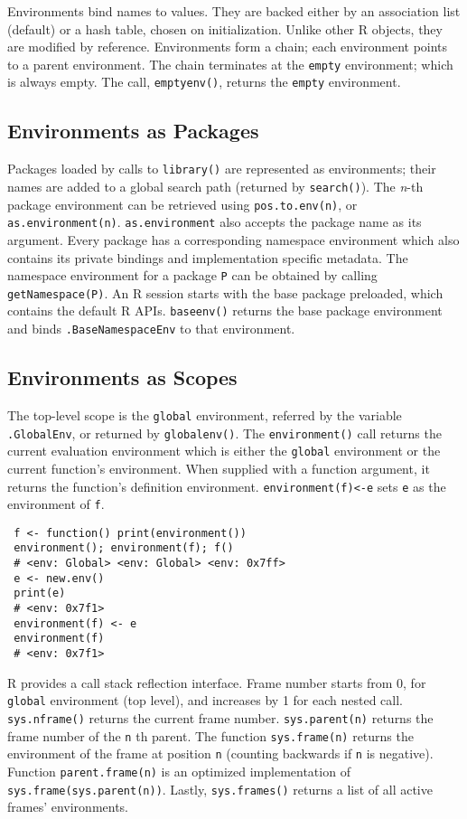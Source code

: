 \documentclass[10pt,review,sigplan,anonymous=true,authorversion=true,nonacm=true]{acmart}
\newcommand{\code}[1]{\lstinline |#1|\xspace}
\newcommand{\asEnvironment}{\code{as.environment}}
\begin{document}
Environments bind names to values. They are backed either by an association list
(default) or a hash table, chosen on initialization. Unlike other R objects,
they are modified by reference. Environments form a chain; each environment
points to a parent environment. The chain terminates at the \code{empty}
environment; which is always empty. The call, \code{emptyenv()}, returns the
\code{empty} environment.

\subsection{Environments as Packages}

Packages loaded by calls to \code{library()} are represented as environments;
their names are added to a global search path (returned by \code{search()}). The
\emph{n}-th package environment can be retrieved using \code{pos.to.env(n)}, or
\code{as.environment(n)}. \asEnvironment also accepts the package name as its
argument. Every package has a corresponding namespace environment which also
contains its private bindings and implementation specific metadata. The
namespace environment for a package \code{P} can be obtained by calling
\code{getNamespace(P)}. An R session starts with the base package preloaded,
which contains the default R APIs. \code{baseenv()} returns the base package
environment and binds \code{.BaseNamespaceEnv} to that environment.

\subsection{Environments as Scopes}
The top-level scope is the \code{global} environment, referred by the variable
\code{.GlobalEnv}, or returned by \code{globalenv()}. The \code{environment()}
call returns the current evaluation environment which is either the
\code{global} environment or the current function's environment. When supplied
with a function argument, it returns the function's definition environment.
\code{environment(f)<-e} sets \code{e} as the environment of \code{f}.

\begin{lstlisting}
 f <- function() print(environment())
 environment(); environment(f); f()
 # <env: Global> <env: Global> <env: 0x7ff>
 e <- new.env()
 print(e)
 # <env: 0x7f1>
 environment(f) <- e
 environment(f)
 # <env: 0x7f1>
\end{lstlisting}

\noindent
R provides a call stack reflection interface. Frame number starts from 0, for
\code{global} environment (top level), and increases by 1 for each nested call.
\code{sys.nframe()} returns the current frame number. \code{sys.parent(n)}
returns the frame number of the \code{n}th parent. The function
\code{sys.frame(n)} returns the environment of the frame at position \code{n}
(counting backwards if \code{n} is negative). Function \code{parent.frame(n)} is
an optimized implementation of \code{sys.frame(sys.parent(n))}. Lastly,
\code{sys.frames()} returns a list of all active frames' environments.
\end{document}

